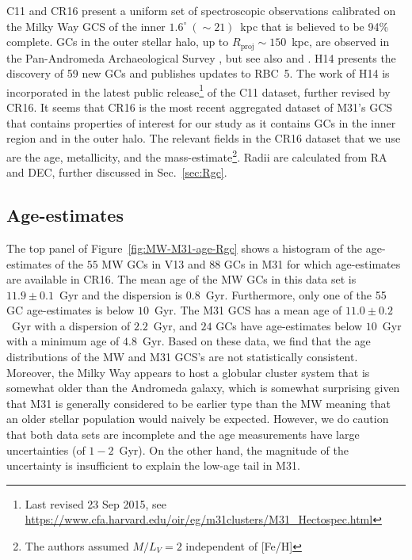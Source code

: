 \documentclass[a4paper,fleqn,usenatbib]{mnras}
\begin{document}
C11 and CR16 present a uniform set of spectroscopic observations calibrated
on the Milky Way GCS of the inner $1.6^\circ~({\sim}21)$~kpc that
is believed to be 94\% complete. GCs in the outer stellar halo, up to
$R_{\text{proj}}\sim150$~kpc, are observed in the Pan-Andromeda Archaeological
Survey \citep[PAndAS, ][hereafter H14]{2014MNRAS.442.2165H}, but see also
\citet{2014MNRAS.442.2929V} and \citet{2019MNRAS.484.1756M}. H14 presents the
discovery of 59 new GCs and publishes updates to RBC~5. The work of H14 is
incorporated in the latest public release\footnote{Last revised 23 Sep 2015, see
\url{https://www.cfa.harvard.edu/oir/eg/m31clusters/M31_Hectospec.html}}
of the C11 dataset, further revised by CR16. It seems that CR16 is the most
recent aggregated dataset of M31's GCS that contains properties of interest
for our study as it contains GCs in the inner region and in the outer halo. The
relevant fields in the CR16 dataset that we use are the age, metallicity, and the
mass-estimate\footnote{The authors assumed $M/L_V = 2$ independent of [Fe/H]}.
Radii are calculated from RA and DEC, further discussed in Sec.~\ref{sec:Rgc}.

\subsection{Age-estimates}
The top panel of Figure~\ref{fig:MW-M31-age-Rgc} shows a histogram of the age-estimates
of the $55$ MW GCs in V13 and $88$ GCs in M31 for which age-estimates are available
in CR16. The mean age of the MW GCs in this data set is $11.9 \pm 0.1$~Gyr and the 
dispersion is $0.8$~Gyr. Furthermore, only one of the 55 GC age-estimates is
below $10$~Gyr. The M31 GCS has a mean age of $11.0 \pm 0.2$~Gyr with a dispersion 
of $2.2$~Gyr, and $24$ GCs have age-estimates below $10$~Gyr with a minimum age 
of $4.8$~Gyr. Based on these data, we find that the age distributions of the MW 
and M31 GCS's are not statistically consistent. Moreover, the Milky Way appears 
to host a globular cluster system that is somewhat older than the Andromeda galaxy,
which is somewhat surprising given that M31 is generally considered to be earlier
type than the MW meaning that an older stellar population would naively be expected.
However, we do caution that both data sets are incomplete and the age 
measurements have large uncertainties (of $1-2$~Gyr). On the other hand, the 
magnitude of the uncertainty is insufficient to explain the low-age tail in M31.
\end{document}
